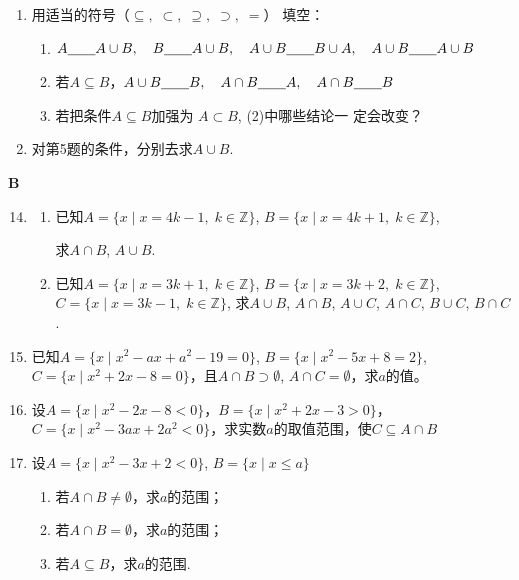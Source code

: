 \begin{enumerate}
\item 用适当的符号（$\subseteq,\; \subset,\; \supseteq,\; \supset,\; =$）
填空：
\begin{enumerate}[(1)]
    \item $A\underline{\qquad} A\cup B,\quad B\underline{\qquad} A\cup B,\quad A\cup B\underline{\qquad} B\cup A,\quad A\cup B\underline{\qquad} A\cup B$
    \item 若$A\subseteq B$，$A\cup B\underline{\qquad} B,\quad A\cap B\underline{\qquad} A,\quad A\cap B\underline{\qquad} B$
    \item 若把条件$A\subseteq B$加强为
    $A\subset B$, (2)中哪些结论一
    定会改变？
\end{enumerate}

\item 对第5题的条件，分别去求$A\cup B$.
\end{enumerate}

\begin{center}
    \bfseries B
\end{center}

\begin{enumerate}
    \setcounter{enumi}{13}
    \item \begin{enumerate}[(1)]
        \item 已知$A=\{x\mid x=4k-1,\; k\in\mathbb{Z}\}$, $B=\{x\mid x=4k+1,\; k\in\mathbb{Z}\}$, 
        
        求$A\cap B$, $A\cup B$.
        \item 已知$A=\{x\mid x=3k+1,\; k\in\mathbb{Z}\}$, $B=\{x\mid x=3k+2,\; k\in\mathbb{Z}\}$, $C=\{x\mid x=3k-1,\; k\in\mathbb{Z}\}$, 求$A\cup B$, $A\cap B$, $A\cup C$, $A\cap C$, $B\cup C$, $B\cap C$.
    \end{enumerate}

\item 已知$A=\{x\mid x^2-ax+a^2-19=0\}$, $B=\{x\mid x^2-5x+8=2\}$, $C=\{x\mid x^2+2x-8=0\}$，且$A\cap B\supset \emptyset$, $A\cap C=\emptyset$，求$a$的值。
\item 设$A=\{x\mid x^2-2x-8<0\}$，$B=\{x\mid x^2+2x-3>0\}$，$C=\{x\mid x^2-3ax+2a^2<0\}$，求实数$a$的取值范围，使$C\subseteq A\cap B$

\item 设$A=\{x\mid x^2-3x+2<0\}$, $B=\{x\mid x\le a\}$
\begin{enumerate}
    \item 若$A\cap B\ne \emptyset$，求$a$的范围；
    \item 若$A\cap B= \emptyset$，求$a$的范围；
    \item 若$A\subseteq B$，求$a$的范围.
\end{enumerate}
\end{enumerate}

